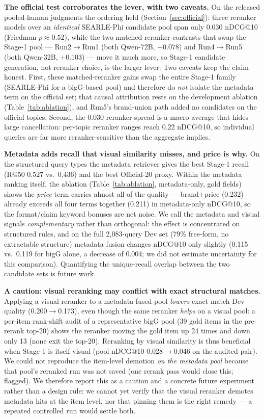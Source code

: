 \documentclass[sigconf,nonacm]{acmart}
\begin{document}
\textbf{The official test corroborates the lever, with two caveats.} On the
released pooled-human judgments the ordering held (Section~\ref{sec:official}):
three reranker models over an \emph{identical} SEARLE-Phi candidate pool span
only 0.030 nDCG@10 (Friedman $p\approx0.52$), while the two matched-reranker
contrasts that swap the Stage-1 pool --- Run2$\to$Run1 (both Qwen-72B, $+0.078$)
and Run4$\to$Run5 (both Qwen-32B, $+0.103$) --- move it much more, so Stage-1
candidate generation, not reranker choice, is the larger lever. Two caveats
keep the claim honest. First, these matched-reranker
gains swap the entire Stage-1 family (SEARLE-Phi for a bigG-based pool) and
therefore do \emph{not} isolate the metadata term on the official set; that
causal attribution rests on the development ablation
(Table~\ref{tab:ablation}), and Run5's brand-union path added no candidates on
the official topics. Second, the 0.030 reranker spread is a macro average that
hides large cancellation: per-topic reranker ranges reach 0.22 nDCG@10, so
individual queries are far more reranker-sensitive than the aggregate implies.

\textbf{Metadata adds recall that visual similarity misses, and price is why.}
On the structured query types the metadata retriever gives the best Stage-1
recall (R@50 0.527 vs.\ 0.436) and the best Official-20 proxy. Within the
metadata ranking itself, the ablation (Table~\ref{tab:ablation},
metadata-only, gold fields) shows the \emph{price} term carries almost all of
the quality --- brand$+$price (0.232) already exceeds all four terms together
(0.211) in metadata-only nDCG@10, so the format/claim keyword bonuses are net
noise. We call the
metadata and visual signals \emph{complementary} rather than orthogonal: the
effect is concentrated on structured rules, and on the full 2{,}083-query Dev
set (79\% free-form, no extractable structure) metadata fusion changes nDCG@10
only slightly (0.115 vs.\ 0.119 for bigG alone, a decrease of 0.004; we did not
estimate uncertainty for this comparison). Quantifying the unique-recall
overlap between the two candidate sets is future work.

\textbf{A caution: visual reranking may conflict with exact structural matches.}
Applying a visual reranker to a metadata-fused pool \emph{lowers} exact-match Dev
quality (0.200$\rightarrow$0.173), even though the same reranker \emph{helps}
on a visual pool: a per-item rank-shift audit of a representative bigG pool
(39 gold items in the pre-rerank top-20) shows the reranker moving the gold
item up 24 times and down only 13 (none exit the top-20). Reranking by visual
similarity is thus beneficial when Stage-1 is itself visual (pool nDCG@10
0.028$\to$0.046 on the audited pair). We could not reproduce the item-level demotion \emph{on the metadata
pool} because that pool's reranked run was not saved (one rerank pass would
close this; flagged). We therefore report this as a caution and a concrete
future experiment rather than a design rule: we cannot yet verify that the
visual reranker demotes metadata hits at the item level, nor that pinning them is the right
remedy --- a repeated controlled run would settle both.
\end{document}
